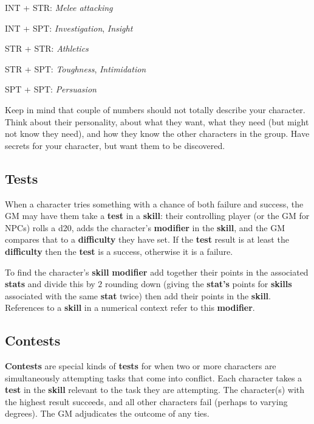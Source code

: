 \documentclass[11pt]{article}
\begin{document}
\begin{multicols}{3}
\begin{multicols}{2}
    INT + STR: ​\textit{Melee attacking}

    INT + SPT: \textit{Investigation}, \textit{Insight}

    STR + STR: \textit{​Athletics}

    STR + SPT: \textit{​Toughness}, \textit{Intimidation}

    SPT + SPT: ​\textit{Persuasion}
  \end{multicols}

  Keep in mind that couple of numbers should not totally describe your character. Think about their personality, about what they want, what they need (but might not know they need), and how they know the other characters in the group. Have secrets for your character, but want them to be discovered.

  \subsection*{Tests}

  When a character tries something with a chance of both failure and success, the GM may have them take a \textbf{​test}​ in a \textbf{skill}: their controlling player (or the GM for NPCs) rolls a d20, adds the character's \textbf{modifier} in the \textbf{skill}, and the GM compares that to a \textbf{difficulty} they have set. If the \textbf{test} result is at least the \textbf{difficulty} then the \textbf{test} is a success, otherwise it is a failure.

  To find the character's \textbf{skill} \textbf{modifier} add together their points in the associated \textbf{stats} and divide this by $2$ rounding down (giving the \textbf{stat's} points for \textbf{skills} associated with the same \textbf{stat} twice) then add their points in the \textbf{skill}. References to a \textbf{skill} in a numerical context refer to this \textbf{modifier}.

  \subsection*{Contests}

  \textbf{Contests} are special kinds of \textbf{tests} for when two or more characters are simultaneously attempting tasks that come into conflict. Each character takes a \textbf{test} in the \textbf{skill} relevant to the task they are attempting. The character(s) with the highest result succeeds, and all other characters fail (perhaps to varying degrees). The GM adjudicates the outcome of any ties.


\end{multicols}
\end{document}
